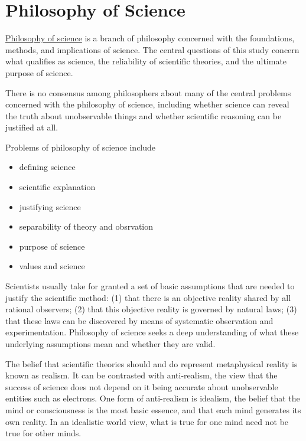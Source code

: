 \hypertarget{philosophy-of-science}{%
\section{Philosophy of Science}\label{philosophy-of-science}}

\href{https://en.wikipedia.org/wiki/Philosophy_of_science}{Philosophy of science} is a branch of philosophy concerned with the foundations, methods, and implications of science. The central questions of this study concern what qualifies as science, the reliability of scientific theories, and the ultimate purpose of science.

There is no consensus among philosophers about many of the central problems concerned with the philosophy of science, including whether science can reveal the truth about unobservable things and whether scientific reasoning can be justified at all.

Problems of philosophy of science include

\begin{itemize}
\tightlist
\item
  defining science
\item
  scientific explanation
\item
  justifying science
\item
  separability of theory and obsrvation
\item
  purpose of science
\item
  values and science
\end{itemize}

Scientists usually take for granted a set of basic assumptions that are needed to justify the scientific method: (1) that there is an objective reality shared by all rational observers; (2) that this objective reality is governed by natural laws; (3) that these laws can be discovered by means of systematic observation and experimentation. Philosophy of science seeks a deep understanding of what these underlying assumptions mean and whether they are valid.

The belief that scientific theories should and do represent metaphysical reality is known as realism. It can be contrasted with anti-realism, the view that the success of science does not depend on it being accurate about unobservable entities such as electrons. One form of anti-realism is idealism, the belief that the mind or consciousness is the most basic essence, and that each mind generates its own reality. In an idealistic world view, what is true for one mind need not be true for other minds.

